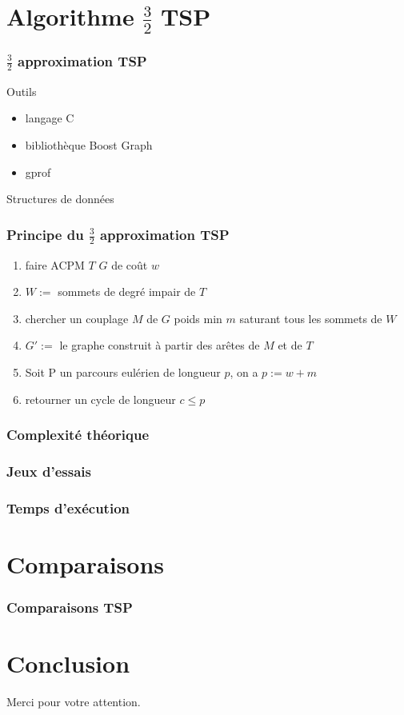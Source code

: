 \documentclass[french]{beamer}
\begin{document}
\section{Algorithme $\frac{3}{2}$ TSP}

\begin{frame}
\frametitle{$\frac{3}{2}$ approximation TSP}
\begin{block}{Outils}
  \begin{itemize}
  \item langage C
  \item bibliothèque Boost Graph
  \item gprof
  \end{itemize}
\end{block}
\begin{block}{Structures de données}
\end{block}
\end{frame}

\begin{frame}
\frametitle{Principe du $\frac{3}{2}$ approximation TSP}
\begin{enumerate}
\item faire ACPM $T$ $G$ de coût $w$
\item $W := $ sommets de degré impair de $T$
\item chercher un couplage $M$ de $G$ poids min $m$ saturant tous les
sommets de $W$
\item $G' := $ le graphe construit à partir des arêtes de $M$ et de
$T$
\item Soit P un parcours eulérien de longueur $p$, on a $p:= w + m$
\item retourner un cycle de longueur $c \leq p$
\end{enumerate}
\end{frame}

\begin{frame}
  \frametitle{Complexité théorique}
\end{frame}

\begin{frame}
  \frametitle{Jeux d'essais}
\end{frame}

\begin{frame}
  \frametitle{Temps d'exécution}
\end{frame}

\section{Comparaisons}

\begin{frame}
  \frametitle{Comparaisons TSP}
  
\end{frame}

\section{Conclusion}
\begin{frame}

\end{frame}


\begin{frame}
  \begin{center}
    Merci pour votre attention.
  \end{center}
\end{frame}
\end{document}
